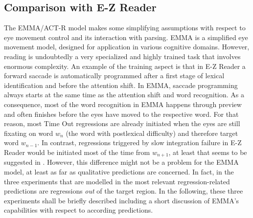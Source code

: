 \subsection{Comparison with E-Z Reader}
The EMMA/ACT-R model makes some simplifying assumptions with respect to eye movement control and its interaction with parsing. 
EMMA is a simplified eye movement model, designed for application in various cognitive domains.  However, reading is undoubtedly a very specialized and highly trained task that involves enormous complexity. An example of the training aspect is that in E-Z Reader a forward saccade is automatically programmed after a first stage of lexical identification and before the attention shift.  In EMMA, saccade programming always starts at the same time as the attention shift and word recognition.  As a consequence, most of the word recognition in EMMA happens through preview and often finishes before the eyes have moved to the respective word.  For that reason, most Time Out regressions are already initiated when the eyes are still fixating on word $w_n$ (the word with postlexical difficulty) and therefore target word $w_{n-1}$.
In contrast, regressions triggered by slow integration failure in E-Z Reader would be initiated most of the time from $w_{n+1}$, at least that seems to be suggested in \cite{ReichleWarrenMcConnell2009}. However, this difference might not be a problem for the EMMA model, at least as far as qualitative predictions are concerned. In fact, in the three  experiments that are modelled in \cite{ReichleWarrenMcConnell2009} the most relevant regression-related predictions are regressions \emph{out} of the target region. 
In the following, these three experiments shall be briefly described including a short discussion of EMMA's capabilities with respect to according predictions. 


